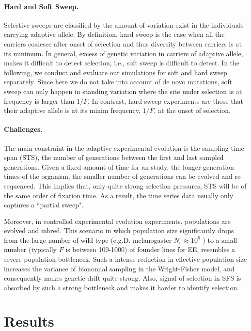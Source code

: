 \documentclass[11pt]{article}
\begin{document}
\paragraph{Hard and Soft Sweep.}
Selective sweeps are classified by the amount of 
variation exist in the individuals carrying adaptive allele. By definition, 
hard sweep is the case when all the carriers coalesce after onset of selection 
and thus diversity between carriers is at its minimum. 
In general, excess of genetic variation in carriers of adaptive allele, makes 
it difficult to detect selection, i.e., soft sweep is difficult to detect. 
In the following, we conduct and evaluate our simulations for soft and hard 
sweep separately. Since here we do not take into account of de novo mutations, 
soft sweep can only happen in standing variation 
where the site under selection is at frequency is larger than $1/F$. In 
contrast, hard sweep experiments are those that their adaptive allele is at its 
minim frequency, $1/F$, at the onset of selection.


\paragraph{Challenges.}
The main constraint in the adaptive experimental evolution is the 
sampling-time-span (STS), the number of generations 
between the first and last sampled generations. Given a 
fixed amount of time for an study, the longer generation times of the organism, 
the smaller number of generations can be evolved and re-sequenced. 
This implies that, only quite strong selection pressures, STS will be of the 
same order of fixation time. As a result, the time series data usually only 
captures a ``partial sweep".

Moreover, in controlled experimental evolution experiments, populations are
evolved and 
inbred. This scenario in which population 
size 
significantly drops from the large number of wild type (e.g.D. melanogaster 
$N_e\approx10^6$ ) to a small number (typically $F$ is between 100-1000) of 
founder lines for EE, resembles a severe population bottleneck. 
Such a intense reduction in effective population size increases the variance of 
bionomial sampling in the Wright-Fisher model, and consequently makes genetic 
drift quite strong. Also, signal of selection in SFS is absorbed by such a 
strong bottleneck and makes it harder to identify selection.

\section{Results}
\end{document}
